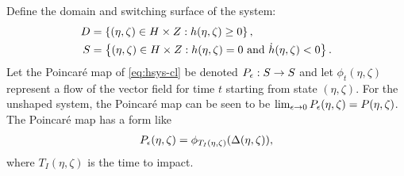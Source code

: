 \documentclass[twocolumn]{article}
\begin{document}
Define the domain and switching surface of the system:
\begin{align}
  D &= \left\{ (\eta, \zeta) \in H \times Z : h(\eta, \zeta) \geq 0 \right\},\\
  \nonumber
  S &= \left\{ (\eta, \zeta) \in H \times Z : h(\eta, \zeta) = 0 \mbox{ and } {\dot h}(\eta, \zeta) < 0 \right\}.
\end{align}
Let the Poincar{\'e} map of \eqref{eq:hsys-cl} be denoted $P_{\epsilon} : S \to S$ and let $\phi_{t}(\eta, \zeta)$ represent a flow of the vector field for time $t$ starting from state $(\eta, \zeta)$.
%
For the unshaped system, the Poincar{\'e} map can be seen to be $\lim_{\epsilon \to 0} P_{\epsilon}(\eta, \zeta) = P(\eta, \zeta)$.
%
The Poincar{\'e} map has a form like
\begin{align}
  P_{\epsilon}(\eta, \zeta) = \phi_{T_{I}(\eta, \zeta)}(\Delta(\eta, \zeta)),
\end{align}
where $T_{I}(\eta, \zeta)$ is the time to impact.
\end{document}
